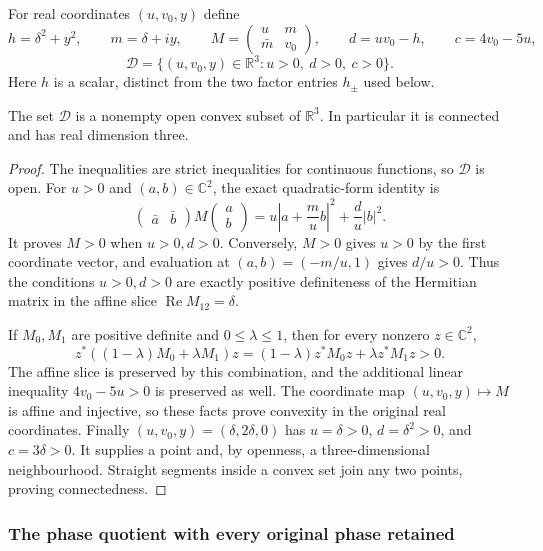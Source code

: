 For real coordinates $(u,v_0,y)$ define
\[
 h=\delta^2+y^2,\qquad m=\delta+iy,\qquad
 M=\begin{pmatrix}u&m\\\bar m&v_0\end{pmatrix},\qquad
 d=uv_0-h,\qquad c=4v_0-5u,
\]
\[
 \mathcal D=\{(u,v_0,y)\in\mathbb R^3:u>0,\ d>0,\ c>0\}.
\]
Here $h$ is a scalar, distinct from the two factor entries
$h_\pm$ used below.

\begin{lemma}
\label{sgd:smooth-addon:convex}
The set $\mathcal D$ is a nonempty open convex subset of
$\mathbb R^3$. In particular it is connected and has real dimension three.
\end{lemma}
\begin{proof}
The inequalities are strict inequalities for continuous functions,
so $\mathcal D$ is open. For $u>0$ and $(a,b)\in\mathbb C^2$,
the exact quadratic-form identity is
\[
 \begin{pmatrix}\bar a&\bar b\end{pmatrix}
 M\begin{pmatrix}a\\b\end{pmatrix}
 =u\left|a+\frac m u b\right|^2+\frac d u|b|^2.
\]
It proves $M>0$ when $u>0,d>0$. Conversely, $M>0$ gives
$u>0$ by the first coordinate vector, and evaluation at
$(a,b)=(-m/u,1)$ gives $d/u>0$.
Thus the conditions $u>0,d>0$ are exactly positive definiteness
of the Hermitian matrix in the affine slice $\operatorname{Re}M_{12}=\delta$.

If $M_0,M_1$ are positive definite and $0\le\lambda\le1$,
then for every nonzero $z\in\mathbb C^2$,
\[
 z^*((1-\lambda)M_0+\lambda M_1)z
 =(1-\lambda)z^*M_0z+\lambda z^*M_1z>0.
\]
The affine slice is preserved by this combination, and the additional
linear inequality $4v_0-5u>0$ is preserved as well.
The coordinate map $(u,v_0,y)\mapsto M$ is affine and injective,
so these facts prove convexity in the original real coordinates.
Finally $(u,v_0,y)=(\delta,2\delta,0)$ has
$u=\delta>0$, $d=\delta^2>0$, and $c=3\delta>0$.
It supplies a point and, by openness, a three-dimensional neighbourhood.
Straight segments inside a convex set join any two points,
proving connectedness.
\end{proof}

\subsubsection{The phase quotient with every original phase retained}

